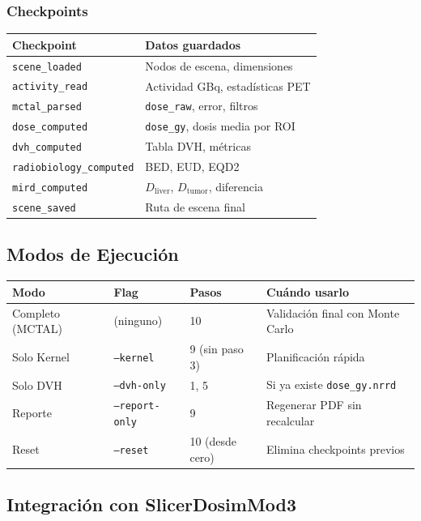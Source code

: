\documentclass[12pt,a4paper]{article}
\begin{document}
\subsubsection{Checkpoints}

\begin{tabular}{p{4cm} p{10cm}}
\toprule
\textbf{Checkpoint} & \textbf{Datos guardados} \\
\midrule
\texttt{scene\_loaded} & Nodos de escena, dimensiones \\
\texttt{activity\_read} & Actividad GBq, estadísticas PET \\
\texttt{mctal\_parsed} & \texttt{dose\_raw}, error, filtros \\
\texttt{dose\_computed} & \texttt{dose\_gy}, dosis media por ROI \\
\texttt{dvh\_computed} & Tabla DVH, métricas \\
\texttt{radiobiology\_computed} & BED, EUD, EQD2 \\
\texttt{mird\_computed} & $D_{\text{liver}}$, $D_{\text{tumor}}$, diferencia \\
\texttt{scene\_saved} & Ruta de escena final \\
\bottomrule
\end{tabular}

\subsection{Modos de Ejecución}

\begin{tabular}{p{3cm} p{3cm} p{2cm} p{6cm}}
\toprule
\textbf{Modo} & \textbf{Flag} & \textbf{Pasos} & \textbf{Cuándo usarlo} \\
\midrule
Completo (MCTAL) & (ninguno) & 10 & Validación final con Monte Carlo \\
Solo Kernel & \texttt{--kernel} & 9 (sin paso 3) & Planificación rápida \\
Solo DVH & \texttt{--dvh-only} & 1, 5 & Si ya existe \texttt{dose\_gy.nrrd} \\
Reporte & \texttt{--report-only} & 9 & Regenerar PDF sin recalcular \\
Reset & \texttt{--reset} & 10 (desde cero) & Elimina checkpoints previos \\
\bottomrule
\end{tabular}

\subsection{Integración con SlicerDosimMod3}
\end{document}
